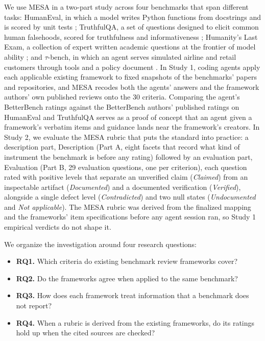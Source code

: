 \documentclass[10pt,conference]{IEEEtran}
\begin{document}
We use MESA in a two-part study across four benchmarks that span different tasks: HumanEval, in which a model writes Python functions from docstrings and is scored by unit tests \cite{human_eval_repository}; TruthfulQA, a set of questions designed to elicit common human falsehoods, scored for truthfulness and informativeness \cite{truthfulqa_repository}; Humanity's Last Exam, a collection of expert written academic questions at the frontier of model ability \cite{phan_etal_hle_2025}; and $\tau$-bench, in which an agent serves simulated airline and retail customers through tools and a policy document \cite{tau_bench_repository}. In Study 1, coding agents apply each applicable existing framework to fixed snapshots of the benchmarks' papers and repositories, and MESA recodes both the agents' answers and the framework authors' own published reviews onto the 30 criteria. Comparing the agent's BetterBench ratings against the BetterBench authors' published ratings on HumanEval and TruthfulQA serves as a proof of concept that an agent given a framework's verbatim items and guidance lands near the framework's creators. In Study 2, we evaluate the MESA rubric that puts the standard into practice: a description part, Description (Part A, eight facets that record what kind of instrument the benchmark is before any rating) followed by an evaluation part, Evaluation (Part B, 29 evaluation questions, one per criterion), each question rated with positive levels that separate an unverified claim (\emph{Claimed}) from an inspectable artifact (\emph{Documented}) and a documented verification (\emph{Verified}), alongside a single defect level (\emph{Contradicted}) and two null states (\emph{Undocumented} and \emph{Not applicable}). The MESA rubric was derived from the finalized mapping and the frameworks' item specifications before any agent session ran, so Study 1 empirical verdicts do not shape it.

We organize the investigation around four research questions:
\begin{itemize}
\item \textbf{RQ1.} Which criteria do existing benchmark review frameworks cover?
\item \textbf{RQ2.} Do the frameworks agree when applied to the same benchmark?
\item \textbf{RQ3.} How does each framework treat information that a benchmark does not report?
\item \textbf{RQ4.} When a rubric is derived from the existing frameworks, do its ratings hold up when the cited sources are checked?
\end{itemize}
\end{document}
